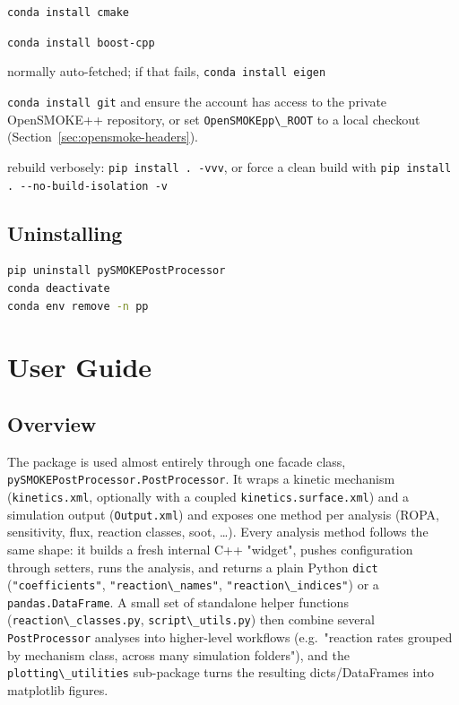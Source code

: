 \documentclass[11pt,a4paper]{report}
\newcommand{\pkg}[1]{\lstinline|#1|}
\begin{document}
\begin{description}[leftmargin=3.2cm]
\item[CMake not found] \pkg{conda install cmake}
\item[Boost not found] \pkg{conda install boost-cpp}
\item[Eigen3 not found] normally auto-fetched; if that fails,
  \pkg{conda install eigen}
\item[OpenSMOKE++ fetch fails (git auth)] \pkg{conda install git} and ensure
  the account has access to the private OpenSMOKE++ repository, or set
  \pkg{OpenSMOKEpp\_ROOT} to a local checkout (Section~\ref{sec:opensmoke-headers}).
\item[Build fails with unclear errors] rebuild verbosely:
  \pkg{pip install . -vvv}, or force a clean build with
  \pkg{pip install . --no-build-isolation -v}
\end{description}

\chapter{Uninstalling}

\begin{lstlisting}[language=bash]
pip uninstall pySMOKEPostProcessor
conda deactivate
conda env remove -n pp
\end{lstlisting}

\part{User Guide}

\chapter{Overview}

The package is used almost entirely through one facade class,
\pkg{pySMOKEPostProcessor.PostProcessor}. It wraps a kinetic mechanism
(\pkg{kinetics.xml}, optionally with a coupled \pkg{kinetics.surface.xml})
and a simulation output (\pkg{Output.xml}) and exposes one method per
analysis (ROPA, sensitivity, flux, reaction classes, soot, \dots{}). Every
analysis method follows the same shape: it builds a fresh internal C++
"widget", pushes configuration through setters, runs the analysis, and
returns a plain Python \pkg{dict} (\pkg{"coefficients"}, \pkg{"reaction\_names"},
\pkg{"reaction\_indices"}) or a \pkg{pandas.DataFrame}. A small set of
standalone helper functions (\pkg{reaction\_classes.py}, \pkg{script\_utils.py})
then combine several \pkg{PostProcessor} analyses into higher-level workflows
(e.g.\ "reaction rates grouped by mechanism class, across many simulation
folders"), and the \pkg{plotting\_utilities} sub-package turns the resulting
dicts/DataFrames into matplotlib figures.
\end{document}
